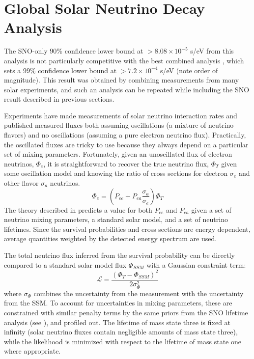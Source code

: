 \clearpage

\section{Global Solar Neutrino Decay Analysis}

The SNO-only $90\%$ confidence lower bound at $>8.08\times10^{-5}$ s/eV from this analysis is not particularly competitive with the best combined analysis \cite{picoreti}, which sets a $99\%$ confidence lower bound at $>7.2\times10^{-4}$ s/eV (note order of magnitude).
This result was obtained by combining measurements from many solar experiments, and such an analysis can be repeated while including the SNO result described in previous sections.

Experiments have made measurements of solar neutrino interaction rates and published measured fluxes both assuming oscillations (a mixture of neutrino flavors) and no oscillations (assuming a pure electron neutrino flux). 
Practically, the oscillated fluxes are tricky to use because they always depend on a particular set of mixing parameters.
Fortunately, given an unoscillated flux of electron neutrinos, $\Phi_e$, it is straightforward to recover the true neutrino flux, $\Phi_T$ given some oscillation model and knowing the ratio of cross sections for electron $\sigma_e$ and other flavor $\sigma_a$ neutrinos.
\begin{equation}
\Phi_e = (P_{ee} + P_{ea} \frac{\sigma_a}{\sigma_e})\Phi_T
\label{flux_conv}
\end{equation}
The theory described in  predicts a value for both $P_{ee}$ and $P_{ea}$ given a set of neutrino mixing parameters, a standard solar model, and a set of neutrino lifetimes.
Since the survival probabilities and cross sections are energy dependent, average quantities weighted by the detected energy spectrum are used.

The total neutrino flux inferred from the survival probability can be directly compared to a standard solar model flux $\Phi_{SSM}$ with a Gaussian constraint term:
\begin{equation}
\mathcal{L} = \frac{(\Phi_T - \Phi_{SSM})^2}{2 \sigma_\Phi^2}
\label{combolike}
\end{equation}
where $\sigma_\Phi$ combines the uncertainty from the measurement with the uncertainty from the SSM.
To account for uncertainties in mixing parameters, these are constrained with similar penalty terms by the same priors from the SNO lifetime analysis (see ), and profiled out. 
The lifetime of mass state three is fixed at infinity (solar neutrino fluxes contain negligible amounts of mass state three), while the likelihood is minimized with respect to the lifetime of mass state one where appropriate.

